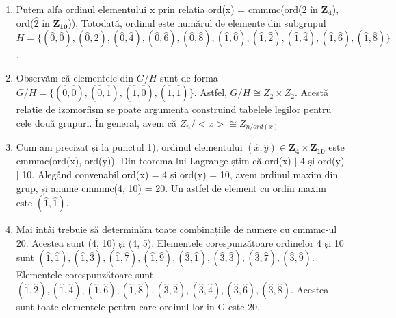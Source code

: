 \documentclass{article}
\begin{document}
\begin{enumerate}
\item Putem alfa ordinul elementului x prin relația ord(x) = cmmmc(ord($\widehat{2}$ în $\mathbf{Z_4}$), ord($\widehat{2}$ în $\mathbf{Z_{10}}$)). Totodată, ordinul este numărul de elemente din subgrupul $H = \{(\widehat{0}, \widehat{0}), 
(\widehat{0}, \widehat{2}), 
(\widehat{0}, \widehat{4}), 
(\widehat{0}, \widehat{6}), 
(\widehat{0}, \widehat{8}),
(\widehat{1}, \widehat{0}), 
(\widehat{1}, \widehat{2}), 
(\widehat{1}, \widehat{4}), 
(\widehat{1}, \widehat{6}), 
(\widehat{1}, \widehat{8})\}$.

\item Observăm că elementele din $G/H$ sunt de forma $G/H = \{
(\overline{\overline{0}},\overline{\overline{0}}), 
(\overline{\overline{0}}, \overline{\overline{1}}),
(\overline{\overline{1}}, \overline{\overline{0}}),
(\overline{\overline{1}}, \overline{\overline{1}})
\}$. Astfel, $G/H \cong Z_{2} \times Z_{2}$. Acestă relație de izomorfism se poate argumenta construind tabelele legilor pentru cele două grupuri. În general, avem că $Z_{n} / <x> \cong Z_{n/ord(x)}$

\item Cum am precizat și la punctul 1), ordinul elementului $(\widehat{x}, \widehat{y}) \in \mathbf{Z_{4} \times \mathbf{Z_{10}}}$ este cmmmc(ord(x), ord(y)). Din teorema lui Lagrange știm că ord(x) $|$ 4 și ord(y) $|$ 10. Alegând convenabil ord(x) = 4 și ord(y) = 10, avem ordinul maxim din grup, și anume cmmmc(4, 10) = 20. Un astfel de element cu ordin maxim este $(\widehat{1}, \widehat{1})$.

\item Mai intâi trebuie să determinăm toate combinațiile de numere cu cmmmc-ul 20. Acestea sunt (4, 10) și (4, 5). Elementele corespunzătoare ordinelor 4 și 10 sunt $(\widehat{1}, \widehat{1}), 
(\widehat{1}, \widehat{3}),
(\widehat{1}, \widehat{7}),
(\widehat{1}, \widehat{9}),
(\widehat{3}, \widehat{1}), 
(\widehat{3}, \widehat{3}),
(\widehat{3}, \widehat{7}),
(\widehat{3}, \widehat{9})
$. Elementele corespunzătoare sunt $(\widehat{1},\widehat{2}), 
(\widehat{1}, \widehat{4}), 
(\widehat{1}, \widehat{6}), 
(\widehat{1}, \widehat{8}),
(\widehat{3},\widehat{2}), 
(\widehat{3}, \widehat{4}), 
(\widehat{3}, \widehat{6}), 
(\widehat{3}, \widehat{8})
$. Acestea sunt toate elementele pentru care ordinul lor in G este 20.

\end{enumerate}
\end{document}
